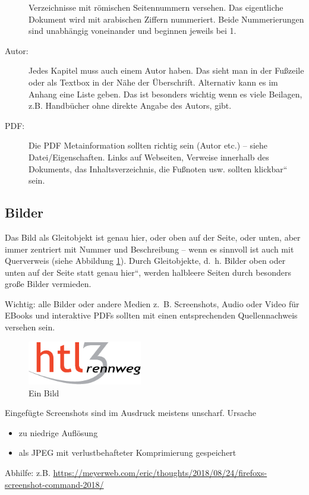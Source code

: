 \begin{description}
Verzeichnisse mit römischen Seitennummern versehen. Das eigentliche
Dokument wird mit arabischen Ziffern nummeriert. Beide Nummerierungen
sind unabhängig voneinander und beginnen jeweils bei 1.
\item [{Autor:}] Jedes Kapitel muss auch einem Autor haben. Das sieht man
in der Fußzeile oder als Textbox in der Nähe der Überschrift. Alternativ
kann es im Anhang eine Liste geben. Das ist besonders wichtig wenn
es viele Beilagen, z.B. Handbücher ohne direkte Angabe des Autors,
gibt.
\item [{PDF:}] Die PDF Metainformation sollten richtig sein (Autor etc.)
-- siehe Datei/Eigenschaften. Links auf Webseiten, Verweise innerhalb
des Dokuments, das Inhaltsverzeichnis, die Fußnoten usw. sollten \quotedblbase klickbar``
sein.
\end{description}

\subsection{Bilder\label{sub:Bilder}}

Das Bild als Gleitobjekt ist genau hier, oder oben auf der Seite,
oder unten, aber immer zentriert mit Nummer und Beschreibung -- wenn
es sinnvoll ist auch mit Querverweis (siehe Abbildung \ref{Bild11}).
Durch Gleitobjekte, d.~h. Bilder oben oder unten auf der Seite statt
\quotedblbase genau hier``, werden halbleere Seiten durch besonders
große Bilder vermieden.

Wichtig: alle Bilder oder andere Medien z.~B. Screenshots, Audio
oder Video für EBooks und interaktive PDFs sollten mit einen entsprechenden
Quellennachweis versehen sein.

\begin{figure}[tbh]
\begin{centering}
\includegraphics[width=5cm]{HTL3RLogoRGB}
\par\end{centering}

\caption{Ein Bild}
\label{Bild11}
\end{figure}

Eingefügte Screenshots sind im Ausdruck meistens unscharf. Ursache
\begin{itemize}
\item zu niedrige Auflösung
\item als JPEG mit verlustbehafteter Komprimierung gespeichert
\end{itemize}
Abhilfe: z.B. \url{https://meyerweb.com/eric/thoughts/2018/08/24/firefoxs-screenshot-command-2018/}

